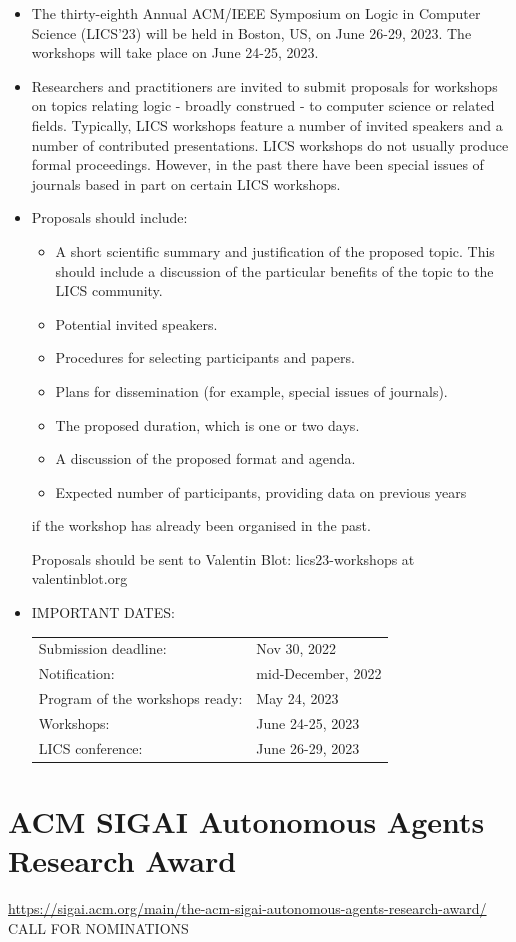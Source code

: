 \documentclass[prodmode,acmtecs]{acmsmall} %
\begin{document}
\begin{itemize}\item  The thirty-eighth Annual ACM/IEEE Symposium on Logic in Computer Science (LICS'23) will be held in Boston, US, on June 26-29, 2023. The workshops will take place on June 24-25, 2023. 
 
\item  Researchers and practitioners are invited to submit proposals for workshops on topics relating logic - broadly construed - to computer science or related fields. Typically, LICS workshops feature a number of invited speakers and a number of contributed presentations. LICS workshops do not usually produce formal proceedings. However, in the past there have been special issues of journals based in part on certain LICS workshops. 
 
\item  Proposals should include: 
 
\begin{itemize}\item   A short scientific summary and justification of the proposed topic. This should include a discussion of the particular benefits of the topic to the LICS community.
\item   Potential invited speakers.
\item   Procedures for selecting participants and papers.
\item   Plans for dissemination (for example, special issues of journals).
\item   The proposed duration, which is one or two days.
\item   A discussion of the proposed format and agenda.
\item   Expected number of participants, providing data on previous years
\end{itemize} 
      if the workshop has already been organised in the past. 
 
  Proposals should be sent to Valentin Blot: lics23-workshops at valentinblot.org 
 
\item  IMPORTANT DATES: 
 
\begin{tabulary}{\linewidth}{LL}Submission deadline:  & Nov 30, 2022 \\
Notification:  & mid-December, 2022 \\
Program of the workshops ready:  & May 24, 2023 \\
Workshops:  & June 24-25, 2023 \\
LICS conference:  & June 26-29, 2023 \\
\end{tabulary}
 
\end{itemize}\section{ACM SIGAI Autonomous Agents Research Award}\label{ACMSIGAIAutonomousAgentsResearchAward}  \href{https://sigai.acm.org/main/the-acm-sigai-autonomous-agents-research-award/}{https://sigai.acm.org/main/the-acm-sigai-autonomous-agents-research-award/}\\ 
CALL FOR NOMINATIONS 
\end{document}
